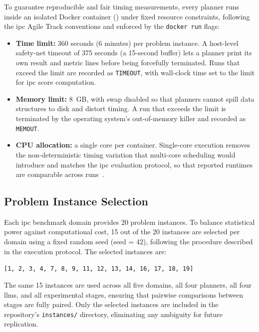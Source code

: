 To guarantee reproducible and fair timing measurements, every planner runs inside an isolated Docker container () under fixed resource constraints, following the \gls{ipc} Agile Track conventions and enforced by the \texttt{docker run} flags:

\begin{itemize}
  \item \textbf{Time limit:} 360 seconds (6 minutes) per problem instance. A host-level safety-net timeout of 375 seconds (a 15-second buffer) lets a planner print its own result and metric lines before being forcefully terminated. Runs that exceed the limit are recorded as \texttt{TIMEOUT}, with wall-clock time set to the limit for \gls{ipc} score computation.
  \item \textbf{Memory limit:} 8~GB, with swap disabled so that planners cannot spill data structures to disk and distort timing. A run that exceeds the limit is terminated by the operating system's out-of-memory killer and recorded as \texttt{MEMOUT}.
  \item \textbf{CPU allocation:} a single core per container. Single-core execution removes the non-deterministic timing variation that multi-core scheduling would introduce and matches the \gls{ipc} evaluation protocol, so that reported runtimes are comparable across runs~\cite{Elis2025}.
\end{itemize}

\subsection{Problem Instance Selection}

Each \gls{ipc} benchmark domain provides 20 problem instances.
To balance statistical power against computational cost, 15 out of the 20 instances are selected per domain using a fixed random seed (seed = 42), following the procedure described in the execution protocol.
The selected instances are:

\begin{center}
\texttt{[1, 2, 3, 4, 7, 8, 9, 11, 12, 13, 14, 16, 17, 18, 19]}
\end{center}

\noindent The same 15 instances are used across all five domains, all four planners, all four \glspl{llm}, and all experimental stages, ensuring that pairwise comparisons between stages are fully paired.
Only the selected instances are included in the repository's \texttt{instances/} directory, eliminating any ambiguity for future replication.


